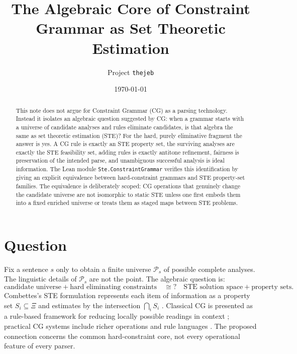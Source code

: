\documentclass[11pt]{article}
\title{The Algebraic Core of Constraint Grammar as Set Theoretic Estimation}
\author{Project \texttt{thejeb}}
\date{\today}
\begin{document}
\maketitle

\begin{abstract}
This note does not argue for Constraint Grammar (CG) as a parsing technology.
Instead it isolates an algebraic question suggested by CG: when a grammar starts
with a universe of candidate analyses and rules eliminate candidates, is that
algebra the same as set theoretic estimation (STE)?  For the hard, purely
eliminative fragment the answer is yes.  A CG rule is exactly an STE property
set, the surviving analyses are exactly the STE feasibility set, adding rules is
exactly antitone refinement, fairness is preservation of the intended parse, and
unambiguous successful analysis is ideal information.  The Lean module
\texttt{Ste.ConstraintGrammar} verifies this identification by giving an
explicit equivalence between hard-constraint grammars and STE property-set
families.  The equivalence is deliberately scoped: CG operations that genuinely
change the candidate universe are not isomorphic to static STE unless one first
embeds them into a fixed enriched universe or treats them as staged maps between
STE problems.
\end{abstract}

\section{Question}
Fix a sentence $s$ only to obtain a finite universe $\mathcal P_s$ of possible
complete analyses.  The linguistic details of $\mathcal P_s$ are not the point.
The algebraic question is:
\[
  \text{candidate universe} + \text{hard eliminating constraints}
  \quad\cong?\quad
  \text{STE solution space} + \text{property sets}.
\]
Combettes's STE formulation represents each item of information as a property
set $S_i\subseteq\Xi$ and estimates by the intersection $\bigcap_i S_i$
\citep{combettes1993}.  Classical CG is presented as a rule-based framework for
reducing locally possible readings in context \citep{karlsson1990constraint,
karlsson1995constraint}; practical CG systems include richer operations and
rule languages \citep{bick2015cg3}.  The proposed connection concerns the
common hard-constraint core, not every operational feature of every parser.
\end{document}
